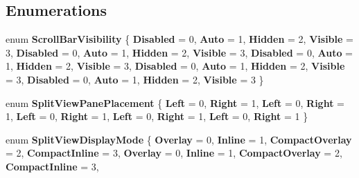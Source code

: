 \subsection*{Enumerations}
\begin{DoxyCompactItemize}
\item 
\mbox{\label{namespace_windows_1_1_u_i_1_1_xaml_1_1_controls_a001a76f53e0cb6e7acfde3aeca1adf39}} 
enum {\bfseries Scroll\+Bar\+Visibility} \{ \newline
{\bfseries Disabled} = 0, 
{\bfseries Auto} = 1, 
{\bfseries Hidden} = 2, 
{\bfseries Visible} = 3, 
\newline
{\bfseries Disabled} = 0, 
{\bfseries Auto} = 1, 
{\bfseries Hidden} = 2, 
{\bfseries Visible} = 3, 
\newline
{\bfseries Disabled} = 0, 
{\bfseries Auto} = 1, 
{\bfseries Hidden} = 2, 
{\bfseries Visible} = 3, 
\newline
{\bfseries Disabled} = 0, 
{\bfseries Auto} = 1, 
{\bfseries Hidden} = 2, 
{\bfseries Visible} = 3, 
\newline
{\bfseries Disabled} = 0, 
{\bfseries Auto} = 1, 
{\bfseries Hidden} = 2, 
{\bfseries Visible} = 3
 \}
\item 
\mbox{\label{namespace_windows_1_1_u_i_1_1_xaml_1_1_controls_a9bf3cca91778a25f599f39263931d8f8}} 
enum {\bfseries Split\+View\+Pane\+Placement} \{ \newline
{\bfseries Left} = 0, 
{\bfseries Right} = 1, 
{\bfseries Left} = 0, 
{\bfseries Right} = 1, 
\newline
{\bfseries Left} = 0, 
{\bfseries Right} = 1, 
{\bfseries Left} = 0, 
{\bfseries Right} = 1, 
\newline
{\bfseries Left} = 0, 
{\bfseries Right} = 1
 \}
\item 
\mbox{\label{namespace_windows_1_1_u_i_1_1_xaml_1_1_controls_a027ad5600573e78453a72cce427da307}} 
enum {\bfseries Split\+View\+Display\+Mode} \{ \newline
{\bfseries Overlay} = 0, 
{\bfseries Inline} = 1, 
{\bfseries Compact\+Overlay} = 2, 
{\bfseries Compact\+Inline} = 3, 
\newline
{\bfseries Overlay} = 0, 
{\bfseries Inline} = 1, 
{\bfseries Compact\+Overlay} = 2, 
{\bfseries Compact\+Inline} = 3, 
\newline

\end{DoxyCompactItemize}
